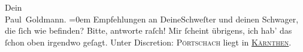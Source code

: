 \begin{ledgroupsized}[t]{13cm}
           \pstart
           Dein {\\[\baselineskip]}\spacefill\mbox{Paul Goldmann.}\pend
           \leftskip=0em{}\pstart
           \noindent{}Empfehlungen an Deine\strikeout{\textcolor{gray}{n}}{ }Schweſter und deinen Schwager, die ſich wie
                  befinden?\pend
           \pstart
           Bitte, antworte raſch! Mir ſcheint übrigens, ich hab’ das ſchon oben irgendwo
                  geſagt.\pend
           \pstart
           Unter Discretion: \textsc{Pörtschach} liegt in \textsc{\uline{Kärnthen}}.\pend
           
         
         \endnumbering{}\end{ledgroupsized}  \newcommand{\dateiname}{L02649}\newcommand{\titel}{Paul Goldmann an Arthur Schnitzler, 18. 8. 1890}\newcommand{\editorInnen}{Martin Anton Müller und Laura Untner}
      